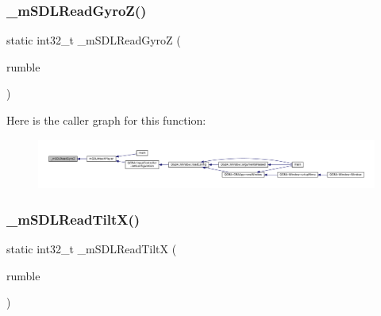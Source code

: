 \subsubsection{\texorpdfstring{\+\_\+m\+S\+D\+L\+Read\+Gyro\+Z()}{\_mSDLReadGyroZ()}}
{\footnotesize\ttfamily static int32\+\_\+t \+\_\+m\+S\+D\+L\+Read\+GyroZ (\begin{DoxyParamCaption}\item[{struct m\+Rotation\+Source $\ast$}]{rumble }\end{DoxyParamCaption})\hspace{0.3cm}{\ttfamily [static]}}

Here is the caller graph for this function\+:
\nopagebreak
\begin{figure}[H]
\begin{center}
\leavevmode
\includegraphics[width=350pt]{sdl-events_8c_a3fc73cbd19f6b72781cd8d546ad22b64_icgraph}
\end{center}
\end{figure}
\mbox{\label{sdl-events_8c_a59d9838f0971eeb48f431096dc09f0a1}} 
\subsubsection{\texorpdfstring{\+\_\+m\+S\+D\+L\+Read\+Tilt\+X()}{\_mSDLReadTiltX()}}
{\footnotesize\ttfamily static int32\+\_\+t \+\_\+m\+S\+D\+L\+Read\+TiltX (\begin{DoxyParamCaption}\item[{struct m\+Rotation\+Source $\ast$}]{rumble }\end{DoxyParamCaption})\hspace{0.3cm}{\ttfamily [static]}}

